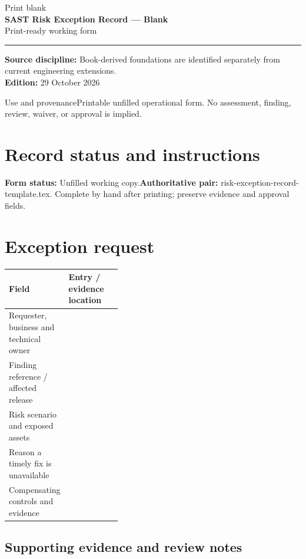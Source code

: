 \documentclass[10pt,letterpaper]{article}
\newcommand{\writearea}[1]{\par\begin{tcolorbox}[colback=white,colframe=linegray,boxrule=0.5pt,height=#1,sharp corners]\mbox{}\end{tcolorbox}\par}
\begin{document}
\hypersetup{pageanchor=false}%
\begin{titlepage}
\vspace*{1.0in}
{\color{bluegray}\Large Print blank}\\[1.0em]
{\color{navy}\Huge\bfseries SAST Risk Exception Record --- Blank}\\[0.7em]
{\Large Print-ready working form}\\[2.0em]
\rule{\linewidth}{1.0pt}
\vfill
\textbf{Source discipline:} Book-derived foundations are identified separately from current engineering extensions.\\
\textbf{Edition:} 29 October 2026
\end{titlepage}\hypersetup{pageanchor=true}
\tableofcontents
\clearpage
\begin{focusbox}{Use and provenance}Printable unfilled operational form. No assessment, finding, review, waiver, or approval is implied.\end{focusbox}
\section{Record status and instructions}
\textbf{Form status:} Unfilled working copy.\quad\textbf{Authoritative pair:} risk-exception-record-template.tex. Complete by hand after printing; preserve evidence and approval fields.

\section{Exception request}
\begin{tabularx}{\linewidth}{@{}p{0.38\linewidth}Y@{}}
\toprule Field & Entry / evidence location\\\midrule
Requester, business and technical owner & \\[1.0em]
\midrule
Finding reference / affected release & \\[1.0em]
\midrule
Risk scenario and exposed assets & \\[1.0em]
\midrule
Reason a timely fix is unavailable & \\[1.0em]
\midrule
Compensating controls and evidence & \\[1.0em]
\midrule
\end{tabularx}
\subsection{Supporting evidence and review notes}
\writearea{1.45in}
\clearpage
\end{document}
